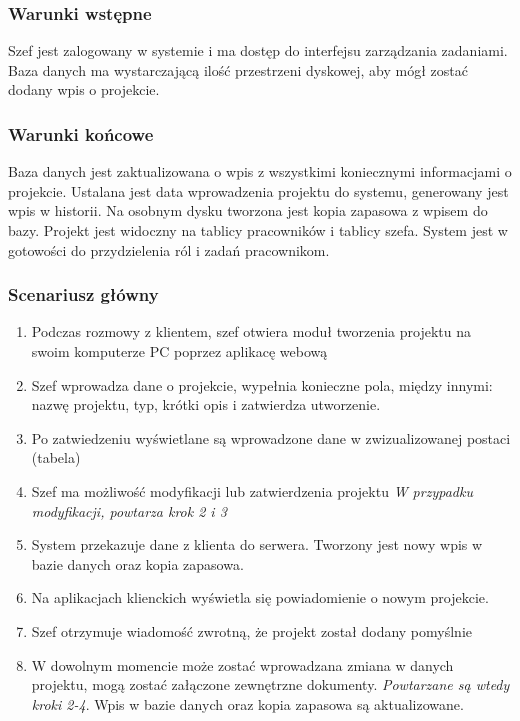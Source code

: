 \documentclass{article}
\begin{document}
\subsubsection*{Warunki wstępne}
Szef jest zalogowany w systemie i ma dostęp do interfejsu zarządzania zadaniami. Baza danych ma wystarczającą ilość przestrzeni
dyskowej, aby mógł zostać dodany wpis o projekcie.

\subsubsection*{Warunki końcowe}
Baza danych jest zaktualizowana o wpis z wszystkimi koniecznymi informacjami o projekcie. Ustalana
jest data wprowadzenia projektu do systemu, generowany jest wpis w historii. Na osobnym dysku tworzona jest
kopia zapasowa z wpisem do bazy. Projekt jest widoczny na tablicy pracowników i tablicy szefa. System jest w
gotowości do przydzielenia ról i zadań pracownikom.

\subsubsection*{Scenariusz główny}
\begin{enumerate}
    \item Podczas rozmowy z klientem, szef otwiera moduł tworzenia projektu na swoim komputerze PC poprzez aplikacę webową
    \item Szef wprowadza dane o projekcie, wypełnia konieczne pola, między innymi: nazwę projektu, typ, krótki opis i zatwierdza utworzenie.
    \item Po zatwiedzeniu wyświetlane są wprowadzone dane w zwizualizowanej postaci (tabela)
    \item Szef ma możliwość modyfikacji lub zatwierdzenia projektu \newline \textit{W przypadku modyfikacji, powtarza krok 2 i 3}
    \item System przekazuje dane z klienta do serwera. Tworzony jest nowy wpis w bazie danych oraz kopia zapasowa.
    \item Na aplikacjach klienckich wyświetla się powiadomienie o nowym projekcie.
    \item Szef otrzymuje wiadomość zwrotną, że projekt został dodany pomyślnie
    \item W dowolnym momencie może zostać wprowadzana zmiana w danych projektu, mogą zostać załączone zewnętrzne dokumenty. \textit{Powtarzane są wtedy kroki 2-4}. Wpis w bazie danych oraz kopia zapasowa są aktualizowane.
\end{enumerate}
\end{document}
